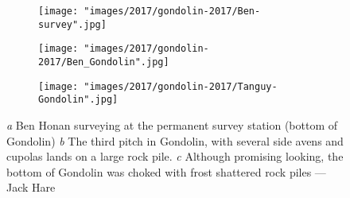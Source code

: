 \documentclass[symmetric, a4paper, 11pt]{article}
\begin{document}
\begin{figure}[t!]

\centering
    \begin{subfigure}[t]{0.505\textwidth}
        \centering
         \texttt{[image: "images/2017/gondolin-2017/Ben-survey".jpg]}
        
        \caption{} \label{surveying gondolin}
    \end{subfigure}
        \hfill
\begin{subfigure}[t]{0.465\textwidth}
\centering
\texttt{[image: "images/2017/gondolin-2017/Ben\_Gondolin".jpg]} 
 \caption{}\label{the third pitch}
\end{subfigure}
    \vspace{0cm}
    \begin{subfigure}[t]{\textwidth}
    \centering
       
        \texttt{[image: "images/2017/gondolin-2017/Tanguy-Gondolin".jpg]}
        \caption{} \label{bottom of gondolin}
    \end{subfigure}
    \caption{
    \emph{a} Ben Honan surveying at the permanent survey station (bottom of Gondolin)
     \emph{b} The third pitch in Gondolin, with several side avens and cupolas lands on a large rock pile.
     \emph{c} Although promising looking, the bottom of Gondolin was choked with frost shattered rock piles --- Jack Hare}
\end{figure}
\clearpage

    
\end{document}
